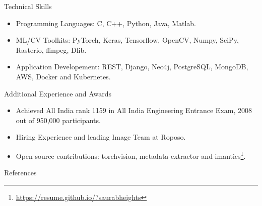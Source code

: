 \documentclass[]{mcdowellcv}
\begin{document}
    \begin{cvsection}{Technical Skills}
        \begin{cvsubsection}{}{}{}
            \begin{itemize}
                \item Programming Languages: C, C++, Python, Java, Matlab.
                \item ML/CV Toolkits: PyTorch, Keras, Tensorflow, OpenCV, Numpy, SciPy, Rasterio, ffmpeg, Dlib.
                \item Application Developement: REST, Django, Neo4j, PostgreSQL, MongoDB, AWS, Docker and Kubernetes.
            \end{itemize}
        \end{cvsubsection}
    \end{cvsection}

    \begin{cvsection}{Additional Experience and Awards}
        \begin{cvsubsection}{}{}{}
            \begin{itemize}
                \item Achieved All India rank 1159 in All India Engineering Entrance Exam, 2008 out of 950,000 participants.
                \item Hiring Experience and leading Image Team at Roposo.
                \item Open source contributions: torchvision, metadata-extractor and imantics\footnote{\href{https://resume.github.io/?saurabheights}{https://resume.github.io/?saurabheights}}.
            \end{itemize}
        \end{cvsubsection}
    \end{cvsection}

        \begin{cvsection}{References}

         \printbibliography[heading=none]

    \end{cvsection}
\end{document}

